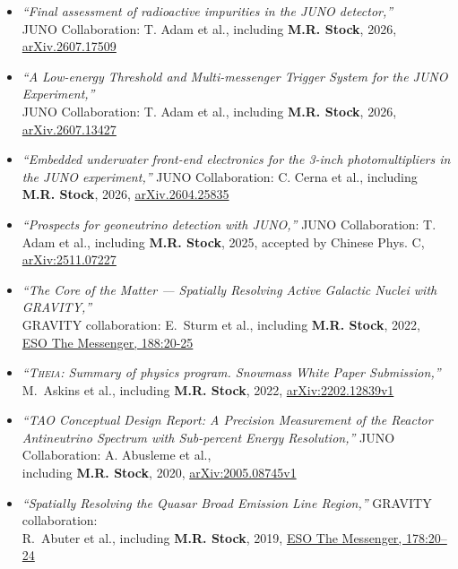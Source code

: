 \documentclass[letterpaper,12pt, oneside]{article}
\newlength{\cvSectionBefore}
\newlength{\cvSectionAfter}
\newcommand{\cvsection}[1]{\par\vspace{\cvSectionBefore}{\Large\textbf{#1}}\par\vspace{\cvSectionAfter}}
\begin{document}
\cvsection{Selected Unrefereed Publications}
\begin{itemize}

\item \textit{“Final assessment of radioactive impurities in the JUNO
detector,”}\\ JUNO Collaboration: T. Adam et al., including \textbf{M.R. Stock}, 2026, \href{https://doi.org/10.48550/arXiv.2607.17509}{arXiv.2607.17509}	


\item \textit{“A Low-energy Threshold and Multi-messenger Trigger System
	for the JUNO Experiment,”}\\ JUNO Collaboration: T. Adam et al., including \textbf{M.R. Stock}, 2026, \href{https://doi.org/10.48550/arXiv.2607.13427}{arXiv.2607.13427}	


\item \textit{“Embedded underwater front-end electronics for the 3-inch photomultipliers in the JUNO experiment,”} JUNO Collaboration: C. Cerna et al., including \textbf{M.R. Stock}, 2026, \href{https://doi.org/10.48550/arXiv.2604.25835}{arXiv.2604.25835}	

\item \textit{“Prospects for geoneutrino detection with JUNO,”} JUNO Collaboration: T. Adam et al., including \textbf{M.R. Stock}, 2025, accepted by Chinese Phys. C, \href{https://doi.org/10.48550/arXiv.2511.07227}{arXiv:2511.07227}

\item \textit{“The Core of the Matter — Spatially Resolving Active Galactic Nuclei with GRAVITY,”} \\ GRAVITY collaboration: E.~Sturm et al., including \textbf{M.R. Stock}, 2022, \\ \href{https://doi.org/10.18727/0722-6691/5275}{ESO The Messenger, 188:20-25}

\item \textit{“\textsc{Theia}: Summary of physics program. Snowmass White Paper Submission,”}  M.~Askins et al., including \textbf{M.R. Stock}, 2022, \href{https://doi.org/10.48550/arXiv.2202.12839}{arXiv:2202.12839v1}

\item \textit{“TAO Conceptual Design Report: A Precision Measurement of the Reactor Antineutrino Spectrum with Sub-percent Energy Resolution,”} JUNO Collaboration: A. Abusleme et al., \\ including \textbf{M.R. Stock}, 2020, \href{https://doi.org/10.48550/arXiv.2005.08745}{arXiv:2005.08745v1}

\item \textit{“Spatially Resolving the Quasar Broad Emission Line Region,”} GRAVITY collaboration: \\ R.~Abuter et al., including \textbf{M.R. Stock}, 2019, \href{https://doi.eso.org/10.18727/0722-6691/5166}{ESO The Messenger, 178:20–24}
\end{itemize}
\end{document}
